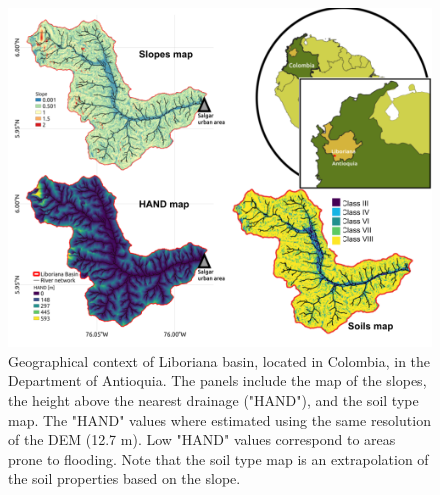 \documentclass[hess, manuscript]{copernicus}
\begin{document}
\begin{figure}[t]
\centering
    \includegraphics[width=12cm]{Figures/UbicacionV2.png}
    \caption{Geographical context of Liboriana basin, located in Colombia, in the Department of Antioquia. The panels include the map of the slopes,  the height above the nearest drainage ("HAND"), and the soil type map. The "HAND" values where estimated using the same resolution of the DEM (12.7 $\text{m}$).  Low "HAND" values correspond to areas prone to flooding. Note that the soil type map is an extrapolation of the soil properties based on the slope.}
    \label{fig:Ubicacion}
\end{figure}


\end{document}
